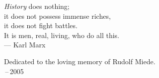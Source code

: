 

\pagestyle{empty} %



\begin{center}

\emph{History} does nothing; \\
it does not possess immense riches, \\
it does not fight battles. \\
It is men, real, living, who do all this. \\ \medskip
--- Karl Marx    
\end{center}

\medskip

\begin{center}
Dedicated to the loving memory of Rudolf Miede. \\ \,--\,2005
\end{center}

\vfill